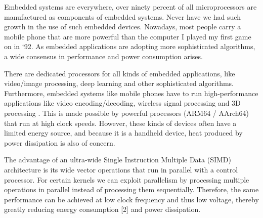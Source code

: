 



Embedded systems are everywhere, over ninety percent of all microprocessors are manufactured as components of embedded systems. %
Never have we had such growth in the use of such embedded devices. Nowadays, most people carry a mobile phone that are more powerful than the computer I played my first game on in `92. As embedded applications are adopting more sophisticated algorithms, a wide consensus in performance and power consumption arises. %

There are dedicated processors for all kinds of embedded applications, like video/image processing, deep learning and other sophisticated algorithms.
Furthermore, embedded systems like mobile phones have to run high-performance applications like video encoding/decoding, wireless signal processing and 3D processing \cite{dongrio1}. This is made possible by powerful processors (ARM64 / AArch64) that run at high clock speeds. However, these kinds of devices often have a limited energy source, and because it is a handheld device, heat produced by power dissipation is also of concern.

The advantage of an ultra-wide Single Instruction Multiple Data (SIMD) architecture is its wide vector operations that run in parallel with a control processor. For certain kernels we can exploit parallelism by processing multiple operations in parallel instead of processing them sequentially. Therefore, the same performance can be achieved at low clock frequency and thus low voltage, thereby greatly reducing energy consumption [2] and power dissipation.%


